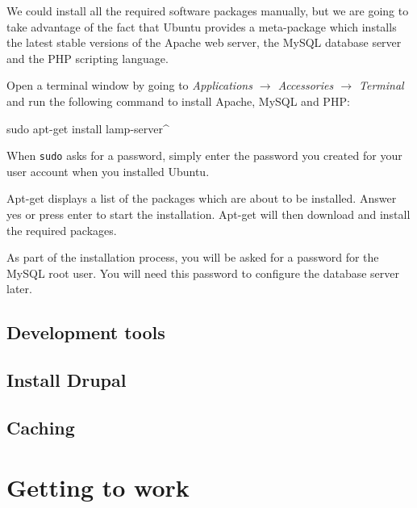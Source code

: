 \documentclass[ebook,10pt,twoside,openright]{memoir}
\begin{document}
We could install all the required software packages manually, but we are going to take advantage of the fact that Ubuntu provides a meta-package which installs the latest stable versions of the Apache web server, the MySQL database server and the PHP scripting language.

Open a terminal window by going to \emph{Applications $\rightarrow$ Accessories $\rightarrow$ Terminal} and run the following command to install Apache, MySQL and PHP:

\begin{squashboxcommand}
sudo apt-get install lamp-server^
\end{squashboxcommand}

When \verb!sudo! asks for a password, simply enter the password you created for your user account when you installed Ubuntu.

Apt-get displays a list of the packages which are about to be installed. Answer yes or press enter to start the installation. Apt-get will then download and install the required packages.
  
As part of the installation process, you will be asked for a password for the MySQL root user. You will need this password to configure the database server later.

\chapter{Development tools} \label{chdevtools}

\chapter{Install Drupal} \label{chinstalldrupal}

\chapter{Caching} \label{chcaching}

\part{Getting to work}
\end{document}
